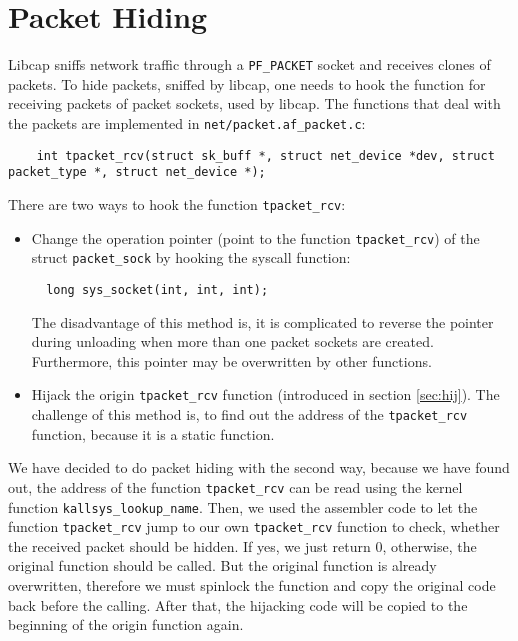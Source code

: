 \section{Packet Hiding}
Libcap sniffs network traffic through a \texttt{PF\_PACKET} socket and receives clones 
of packets. To hide packets, sniffed by libcap, one needs to hook the 
function for receiving packets of packet sockets, used by libcap. The 
functions that deal with the packets are implemented in \verb+net/packet.af_packet.c+: 
\begin{center}
\lstset{escapechar=,style=customc}
	\begin{lstlisting}
  	int tpacket_rcv(struct sk_buff *, struct net_device *dev, struct packet_type *, struct net_device *); 
	\end{lstlisting}
\end{center}
There are two ways to hook the function \texttt{tpacket\_rcv}:
\begin{itemize}
\item Change the operation pointer (point to the function \texttt{tpacket\_rcv}) of the struct \texttt{packet\_sock} by hooking the syscall function:
\begin{center}
\lstset{escapechar=,style=customc}
	\begin{lstlisting}
  long sys_socket(int, int, int);
		\end{lstlisting}
\end{center}
The disadvantage of this method is, it is complicated to reverse the pointer during unloading when more than one packet sockets are created. Furthermore, this pointer may be overwritten by other functions.
\item Hijack the origin \texttt{tpacket\_rcv} function (introduced in section \ref{sec:hij}). The challenge of this method is, to find out the address of the \texttt{tpacket\_rcv} function, because it is a static function.  
\end{itemize}
We have decided to do packet hiding with the second way, because we have found out, the address of the function \texttt{tpacket\_rcv} can be read using the kernel function \texttt{kallsys\_lookup\_name}. Then, we used the assembler code to let the function \texttt{tpacket\_rcv} jump to our own \texttt{tpacket\_rcv} function to check, whether the received packet should be hidden. If yes, we just return 0, otherwise, the original function should be called. But the original function is already overwritten, therefore we must spinlock the function and copy the original code back before the calling. After that, the hijacking code will be copied to the beginning of the origin function again. \\

